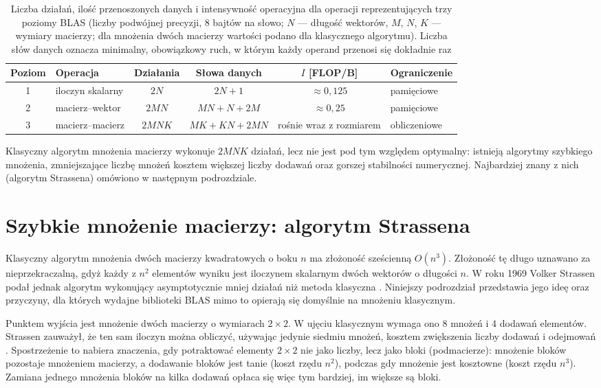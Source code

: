 \documentclass[a4paper,12pt]{book} %
\begin{document}
\begin{table}[t!]
\centering
\caption{Liczba działań, ilość przenoszonych danych i intensywność operacyjna dla operacji reprezentujących trzy poziomy BLAS (liczby podwójnej precyzji, $8$ bajtów na słowo; $N$ --- długość wektorów, $M$, $N$, $K$ --- wymiary macierzy; dla mnożenia dwóch macierzy wartości podano dla klasycznego algorytmu). Liczba słów danych oznacza minimalny, obowiązkowy ruch, w którym każdy operand przenosi się dokładnie raz}
\label{tab:blas-intensywnosc}
\small
\setlength{\tabcolsep}{4pt}
\begin{tabular}{clcccl}
\hline
Poziom & Operacja & Działania & Słowa danych & $I$ [FLOP/B] & Ograniczenie \\
\hline
1 & iloczyn skalarny & $2N$   & $2N+1$      & $\approx 0{,}125$       & pamięciowe \\
2 & macierz--wektor  & $2MN$  & $MN+N+2M$   & $\approx 0{,}25$        & pamięciowe \\
3 & macierz--macierz & $2MNK$ & $MK+KN+2MN$ & rośnie wraz z rozmiarem & obliczeniowe \\
\hline
\end{tabular}
\end{table}

Klasyczny algorytm mnożenia macierzy wykonuje $2MNK$ działań, lecz nie jest pod tym względem optymalny: istnieją algorytmy szybkiego mnożenia, zmniejszające liczbę mnożeń kosztem większej liczby dodawań oraz gorszej stabilności numerycznej. Najbardziej znany z nich (algorytm Strassena) omówiono w następnym podrozdziale.

\section{Szybkie mnożenie macierzy: algorytm Strassena}
\label{sec:blas-strassen}

Klasyczny algorytm mnożenia dwóch macierzy kwadratowych o boku $n$ ma złożoność sześcienną $O(n^3)$. Złożoność tę długo uznawano za nieprzekraczalną, gdyż każdy z $n^2$ elementów wyniku jest iloczynem skalarnym dwóch wektorów o długości $n$. W roku 1969 Volker Strassen podał jednak algorytm wykonujący asymptotycznie mniej działań niż metoda klasyczna \cite{strassen1969gaussian}. Niniejszy podrozdział przedstawia jego ideę oraz przyczyny, dla których wydajne biblioteki BLAS mimo to opierają się domyślnie na mnożeniu klasycznym.

Punktem wyjścia jest mnożenie dwóch macierzy o wymiarach $2 \times 2$. W ujęciu klasycznym wymaga ono $8$ mnożeń i $4$ dodawań elementów. Strassen zauważył, że ten sam iloczyn można obliczyć, używając jedynie siedmiu mnożeń, kosztem zwiększenia liczby dodawań i odejmowań \cite{strassen1969gaussian}. Spostrzeżenie to nabiera znaczenia, gdy potraktować elementy $2 \times 2$ nie jako liczby, lecz jako bloki (podmacierze): mnożenie bloków pozostaje mnożeniem macierzy, a dodawanie bloków jest tanie (koszt rzędu $n^2$), podczas gdy mnożenie jest kosztowne (koszt rzędu $n^3$). Zamiana jednego mnożenia bloków na kilka dodawań opłaca się więc tym bardziej, im większe są bloki.
\end{document}
